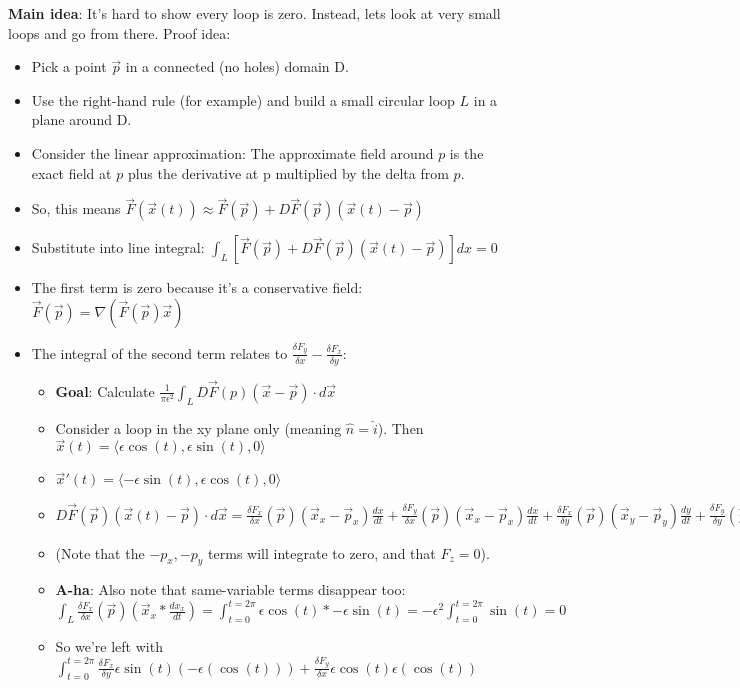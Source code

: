 \documentclass[11pt, oneside]{article}   	%
\begin{document}
\textbf{Main idea}: It's hard to show every loop is zero.  Instead, lets look at very small loops and go from there.  Proof idea:
\begin{itemize}
\item Pick a point $\vec{p}$ in a connected (no holes) domain D.
\item Use the right-hand rule (for example) and build a small circular loop $L$ in a plane around D.
\item Consider the linear approximation: The approximate field around $p$ is the exact field at $p$ plus the derivative at p multiplied by the delta from $p$. 
\item So, this means $\vec{F}(\vec{x}(t)) \approx \vec{F}(\vec{p}) + D\vec{F}(\vec{p})(\vec{x}(t)-\vec{p})$
\item Substitute into line integral: $\int_L [\vec{F}(\vec{p}) + D\vec{F}(\vec{p})(\vec{x}(t)-\vec{p})]dx = 0$
\item The first term is zero because it's a conservative field: $\vec{F}(\vec{p}) = \nabla (\vec{F}(\vec{p})\vec{x})$
\item The integral of the second term relates to $\frac{\delta F_y}{\delta x} -\frac{\delta F_x}{\delta y}$:
\begin{itemize}
\item \textbf{Goal}: Calculate $\frac{1}{\pi\epsilon^2} \int_L D\vec{F}(p)(\vec{x} - \vec{p})\cdot d\vec{x}$
\item Consider a loop in the xy plane only (meaning $\hat{n} = \hat{i}$). Then $\vec{x}(t) = \langle \epsilon \cos(t), \epsilon \sin(t), 0 \rangle$
\item $\vec{x}'(t) =  \langle -\epsilon \sin(t), \epsilon \cos(t), 0 \rangle$
\item $D\vec{F}(\vec{p})(\vec{x}(t)-\vec{p}) \cdot d\vec{x} 
=  \frac{\delta F_x}{\delta x}(\vec{p})(\vec{x}_x-\vec{p}_x)\frac{dx}{dt} + \frac{\delta F_y}{\delta x}(\vec{p})(\vec{x}_x-\vec{p}_x)\frac{dx}{dt}
+ \frac{\delta F_x}{\delta y}(\vec{p})(\vec{x}_y-\vec{p}_y)\frac{dy}{dt} + \frac{\delta F_y}{\delta y}(\vec{p})(\vec{x}_y-\vec{p}_x)\frac{dy}{dt}$
\item (Note that the $-p_x, -p_y$ terms will integrate to zero, and that $F_z = 0$).
\item \textbf{A-ha}: Also note that same-variable terms disappear too: $\int_L \frac{\delta F_x}{\delta x}(\vec{p})(\vec{x}_x*\frac{dx_x}{dt})  = \int_{t=0}^{t=2 \pi}\epsilon \cos(t) * -\epsilon \sin(t) = -\epsilon^2 \int_{t=0}^{t=2 \pi} \sin(t) = 0$
\item So we're left with $\int_{t=0}^{t=2\pi} \frac{\delta F_x}{\delta y} \epsilon \sin(t) (-\epsilon(\cos(t))) +  \frac{\delta F_y}{\delta x} \epsilon \cos(t) \epsilon(\cos(t))$ 

\end{itemize}
\end{itemize}
\end{document}

